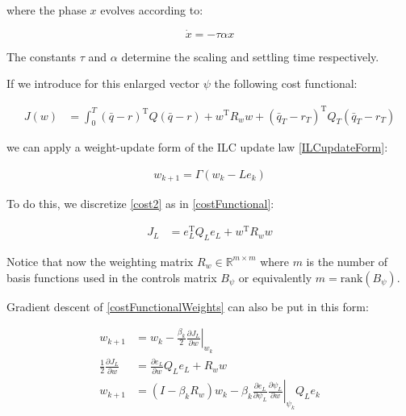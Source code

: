\documentclass[10pt,a4paper]{article}
\newcommand\at[2]{\left.#1\right|_{#2}} %
\newcommand{\joint}{q} %
\newcommand{\state}{\bar{\joint}} %
\newcommand{\error}{e} %
\newcommand{\traj}{r} %
\newcommand{\fullvec}{\psi} %
\newcommand{\phase}{x} %
\newcommand{\weights}{w} %
\newcommand{\qmatrix}{\Gamma} %
\newcommand{\lmatrix}{L} %
\newcommand{\ValueFunction}{J}
\begin{document}
where the phase $\phase$ evolves according to:

\begin{equation}
\dot{\phase} = -\tau\alpha\phase
\end{equation}

The constants $\tau$ and $\alpha$ determine the scaling and settling time respectively. 

If we introduce for this enlarged vector $\fullvec$ the following cost functional:

\begin{equation}
\begin{aligned}
J(\weights) &= \int_{0}^{T} (\state - \traj)^{\mathrm{T}}Q(\state - \traj) + \weights^{\mathrm{T}}R_w\weights + (\state_T-\traj_T)^{\mathrm{T}}Q_{T}(\state_T-\traj_T) 
\end{aligned}
\label{cost2}
\end{equation}

we can apply a weight-update form of the ILC update law \eqref{ILCupdateForm}:

\begin{equation}
\begin{aligned}
\weights_{k+1} = \qmatrix(\weights_{k} - \lmatrix\error_{k})
\end{aligned}
\label{ILCupdateFormWeights}
\end{equation}

To do this, we discretize \eqref{cost2} as in \eqref{costFunctional}:

\begin{equation}
\begin{aligned}
\ValueFunction_L &= \error_L^{\mathrm{T}}Q_L\error_L + \weights^{\mathrm{T}}R_w\weights
\end{aligned}
\label{costFunctionalWeights}
\end{equation}

Notice that now the weighting matrix $R_w \in \mathbb{R}^{m \times m}$ where $m$ is the number of basis functions used in the controls matrix $B_{\fullvec}$ or equivalently $m = \text{rank}(B_{\fullvec})$.

Gradient descent of \eqref{costFunctionalWeights} can also be put in this form:

\begin{equation}
\begin{aligned}
\weights_{k+1} &= \weights_k - \frac{\beta_k}{2} \at{\frac{\partial{\ValueFunction_L}}{\partial{\weights}}}{\weights_k} \\
\frac{1}{2}\frac{\partial{\ValueFunction_L}}{\partial{\weights}} &= \frac{\partial{\error_L}}{\partial{\weights}}Q_L\error_L + R_{\weights}\weights \\
\weights_{k+1} &= (I - \beta_kR_{\weights})\weights_k - \beta_k\frac{\partial{\error_L}}{\partial{\fullvec_L}}\at{\frac{\partial{\fullvec_L}}{\partial{\weights}}}{\fullvec_k}Q_L\error_k
\end{aligned}
\label{ILCgradientDescentWeights}
\end{equation}
\end{document}
